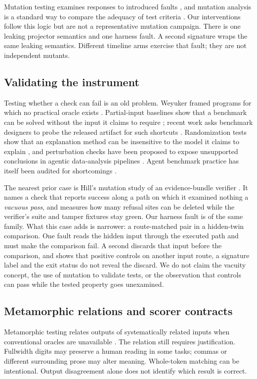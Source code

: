 \documentclass[11pt]{article}
\begin{document}
Mutation testing examines responses to introduced faults \cite{jia}, and mutation analysis is a standard way to compare the adequacy of test criteria \cite{andrews}. Our interventions follow this logic but are not a representative mutation campaign. There is one leaking projector semantics and one harness fault. A second signature wraps the same leaking semantics. Different timeline arms exercise that fault; they are not independent mutants.

\subsection{Validating the instrument}
Testing whether a check can fail is an old problem. Weyuker framed programs for which no practical oracle exists \cite{weyuker}. Partial-input baselines show that a benchmark can be solved without the input it claims to require \cite{poliak}; recent work asks benchmark designers to probe the released artifact for such shortcuts \cite{brown}. Randomization tests show that an explanation method can be insensitive to the model it claims to explain \cite{adebayo}, and perturbation checks have been proposed to expose unsupported conclusions in agentic data-analysis pipelines \cite{rewolinski}. Agent benchmark practice has itself been audited for shortcomings \cite{kapoor}.

The nearest prior case is Hill's mutation study of an evidence-bundle verifier \cite{hill}. It names a check that reports success along a path on which it examined nothing a \emph{vacuous pass}, and measures how many refusal sites can be deleted while the verifier's suite and tamper fixtures stay green. Our harness fault is of the same family. What this case adds is narrower: a route-matched pair in a hidden-twin comparison. One fault reads the hidden input through the executed path and must make the comparison fail. A second discards that input before the comparison, and shows that positive controls on another input route, a signature label and the exit status do not reveal the discard. We do not claim the vacuity concept, the use of mutation to validate tests, or the observation that controls can pass while the tested property goes unexamined.

\subsection{Metamorphic relations and scorer contracts}
Metamorphic testing relates outputs of systematically related inputs when conventional oracles are unavailable \cite{segura,chen}. The relation still requires justification. Fullwidth digits may preserve a human reading in some tasks; commas or different surrounding prose may alter meaning. Whole-token matching can be intentional. Output disagreement alone does not identify which result is correct.
\end{document}
